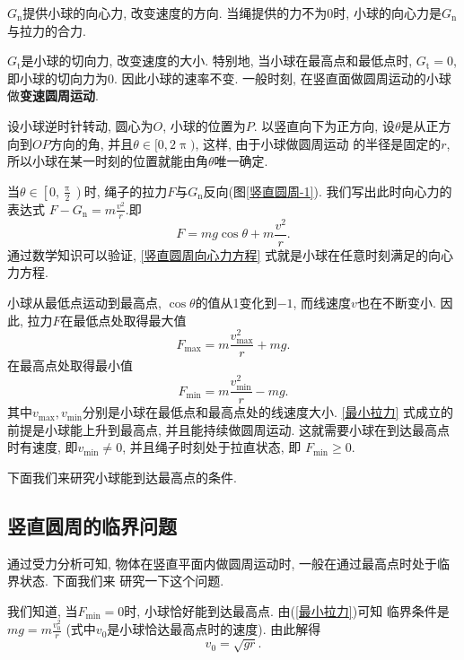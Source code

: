 \documentclass[11pt,a4paper]{ctexbook}
\begin{document}
$G_\text{n}$提供小球的向心力, 改变速度的方向.
当绳提供的力不为0时, 小球的向心力是$G_\text{n}$与拉力的合力.

$G_\text{t}$是小球的切向力, 改变速度的大小. 特别地, 当小球在最高点和最低点时, $G_\text{t} = 0$, 即小球的切向力为0.
因此小球的速率不变. 一般时刻, 在竖直面做圆周运动的小球做\textbf{变速圆周运动}.

设小球逆时针转动, 圆心为$O$, 小球的位置为$P$. 以竖直向下为正方向,
设$\theta$是从正方向到$OP$方向的角, 并且$\theta\in[ 0,2\uppi)$, 这样, 由于小球做圆周运动
的半径是固定的$r$, 所以小球在某一时刻的位置就能由角$\theta$唯一确定.

当$\theta\in\left[ 0,\displaystyle\frac{\uppi}{2}\right)$时, 绳子的拉力$F$与$G_\text{n}$反向(图\ref{竖直圆周-1}).
我们写出此时向心力的表达式
$F - G_\text{n} = m\displaystyle\frac{v^2}{r}.$即
\begin{equation}
    F = mg\cos \theta + m\frac{v^2}{r}.
    \label{竖直圆周向心力方程}
\end{equation}
通过数学知识可以验证, \eqref{竖直圆周向心力方程} 式就是小球在任意时刻满足的向心力方程.

小球从最低点运动到最高点, $\cos \theta$的值从1变化到$-1$, 而线速度$v$也在不断变小.
因此, 拉力$F$在最低点处取得最大值
\begin{equation*}
	F_\text{max} = m\frac{v_\text{max}^2}{r} + mg.
	\label{最大拉力}
\end{equation*}
在最高点处取得最小值
\begin{equation}
	F_\text{min} = m\frac{v_\text{min}^2}{r} - mg.
	\label{最小拉力}
\end{equation}
其中$v_\text{max}, v_\text{min}$分别是小球在最低点和最高点处的线速度大小.
\eqref{最小拉力} 式成立的前提是小球能上升到最高点, 并且能持续做圆周运动.
这就需要小球在到达最高点时有速度, 即$v_\text{min}\neq 0$, 并且绳子时刻处于拉直状态, 即
$F_\text{min}\geqslant 0.$

下面我们来研究小球能到达最高点的条件.

\subsection{竖直圆周的临界问题}


通过受力分析可知, 物体在竖直平面内做圆周运动时, 一般在通过最高点时处于临界状态. 下面我们来
研究一下这个问题.

我们知道, 当$F_\text{min} = 0$时, 小球恰好能到达最高点. 由(\ref{最小拉力})可知
临界条件是$mg = m\displaystyle\frac{v_0^2}{r}$ (式中$v_0$是小球恰达最高点时的速度). 由此解得
\begin{equation}
	v_0 = \sqrt{gr}.
	\label{临界速度}
\end{equation}
\end{document}
